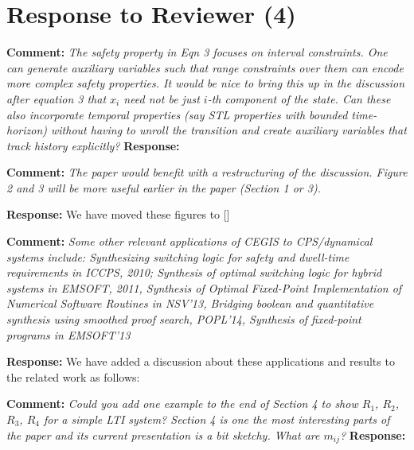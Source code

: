 \documentclass{article}
\begin{document}
\section{Response to Reviewer (4)}

{\bf Comment:  } {\itshape The safety property in Eqn 3 focuses on interval constraints. One can generate auxiliary variables such that range constraints over them can encode
more complex safety properties. It would be nice to bring this up in the discussion after equation 3 that $x_i$ need not be just $i$-th component of the
state.  Can these also incorporate temporal properties (say STL properties with bounded time-horizon) without having to unroll the transition and
create auxiliary variables that track history explicitly?}
\vspace{1em}
{\bf Response: }

\vspace{2em}
{\bf Comment: } {\itshape The paper would benefit with a restructuring of the discussion. Figure 2 and 3 will be more useful
earlier in the paper (Section 1 or 3).}

\vspace{1em}
{\bf Response: }
We have moved these figures to [] 
\vspace{2em}

{\bf Comment: } {\itshape
Some other relevant applications of CEGIS to CPS/dynamical systems include: Synthesizing switching logic for
safety and dwell-time requirements in ICCPS, 2010; Synthesis of optimal switching logic for hybrid systems in EMSOFT, 2011, Synthesis of Optimal
Fixed-Point Implementation of Numerical Software Routines in NSV'13, Bridging boolean and quantitative synthesis using smoothed proof search,
POPL'14, Synthesis of fixed-point programs in EMSOFT'13}

\vspace{1em}
{\bf Response: }
We have added a discussion about these applications and results to the related work as follows:

\vspace{2em}
{\bf Comment: } {\itshape Could you add one example to the end of Section 4 to show $R_1$, $R_2$, $R_3$, $R_4$ for a simple LTI system? Section 4 is one the most interesting parts
of the paper and its current presentation is a bit sketchy. What are $m_{ij}$?}
\vspace{1em}
{\bf Response: }





\end{document}
